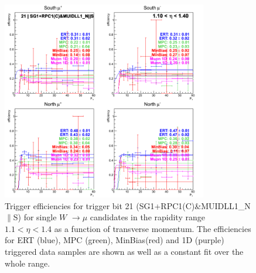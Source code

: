 \begin{figure}[h!]

  \centering

  \includegraphics[width=0.8\textwidth]{./figures/run13_trigeffipt_eta0_trig21_lin.png}
  \caption{\label{fig:run13_trigeffipt_eta0_nper0_trig21_lin} Trigger efficiencies for trigger bit 21 (SG1+RPC1(C)\&MUIDLL1\_N$\|$S) for single $W$ $\rightarrow \mu$ candidates in the rapidity range $ 1.1 < \eta < 1.4$ as a function of transverse momentum. The efficiencies for ERT (blue), MPC (green), MinBias(red) and 1D (purple) triggered data samples are shown as well as a constant fit over the whole range.}

\end{figure}
\clearpage
